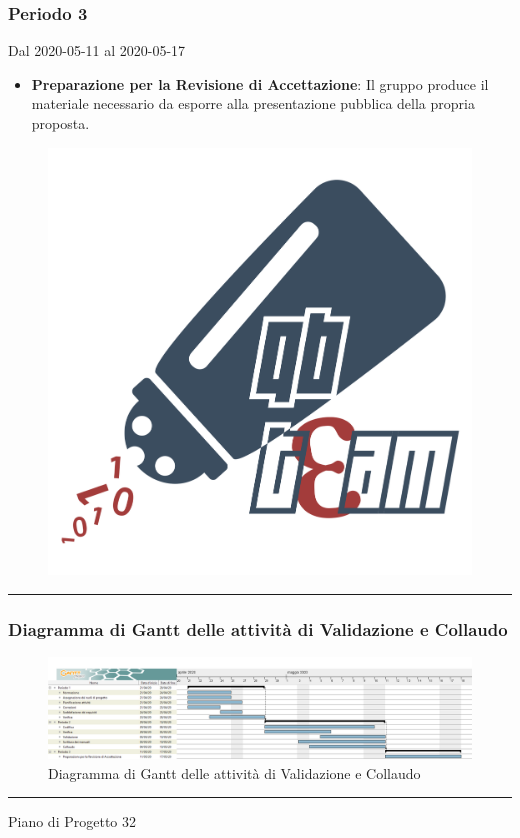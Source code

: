 \subsubsection{Periodo 3} 
Dal 2020-05-11 al 2020-05-17
\begin{itemize}
	\item \textbf{Preparazione per la Revisione di Accettazione}: Il gruppo produce il materiale necessario da esporre alla presentazione pubblica della propria proposta.
\end{itemize}


\newpage
\begin{landscape}
\begin{figure}[h]
	\includegraphics[scale=0.035]{../../Utilita/Immagini/qbteam.png}
\end{figure}
\hrule

\subsubsection{Diagramma di Gantt delle attività di Validazione e Collaudo}
\pagestyle{empty}
\begin{figure}[h]
	\centering
	\includegraphics[scale=0.34]{Sezioni/DiagrammiGantt/Validazione.png}
	\caption{Diagramma di Gantt delle attività di Validazione e Collaudo}
\end{figure}

\hrule
\vskip 6pt
Piano di Progetto \hskip 25cm {32} 
\end{landscape}
\clearpage
